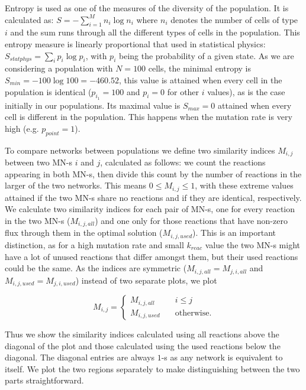 \documentclass[a4paper,12pt]{article}
\begin{document}
Entropy is used as one of the measures of the diversity of the population. It is calculated as: $S=- \sum^{M}_{i=1} n_i \log n_i $ where $n_i$ denotes the number of cells of type $i$ and the sum runs through all the different types of cells in the population. This entropy measure is linearly proportional that used in statistical physics: $S_{statphys}=\sum_i p_i \log p_i$, with $p_i$ being the probability of a given state. As we are considering a population with $N=100$ cells, the minimal entropy is $S_{min}=-100\log100=-460.52$, this value is attained when every cell in the population is identical ($p_{i_1}=100$ and $p_i=0$ for other $i$ values), as is the case initially in our populations. Its maximal value is $S_{max}=0$ attained when every cell is different in the population. This happens when the mutation rate is very high (e.g. $p_{point}=1$). 


To compare networks between populations we define two similarity indices $M_{i,j}$ between two MN-s $i$ and $j$, calculated as follows: we count the reactions appearing in both MN-s, then divide this count by the number of reactions in the larger of the two networks. This means $0\leq M_{i,j} \leq 1$, with these extreme values attained if the two MN-s share no reactions and if they are identical, respectively. We calculate two similarity indices for each pair of MN-s, one for every reaction in the two MN-s ($M_{i,j,all}$) and one only for those reactions that have non-zero flux through them in the optimal solution ($M_{i,j,used}$). This is an important distinction, as for a high mutation rate and small $k_{reac}$ value the two MN-s might have a lot of unused reactions that differ amongst them, but their used reactions could be the same. As the indices are symmetric ($M_{i,j,all}=M_{j,i,all}$ and $M_{i,j,used}=M_{j,i,used}$) instead of two separate plots, we plot 

$$
M_{i,j}= \left\{
	\begin{array}{ll}
		M_{i,j,all} & \quad i \leq j \\
		M_{i,j,used} & \quad \text{otherwise.}
	\end{array}
\right.
$$

Thus we show the similarity indices calculated using all reactions above the diagonal of the plot and those calculated using the used reactions below the diagonal. The diagonal entries are always $1$-s as any network is equivalent to itself. We plot the two regions separately to make distinguishing between the two parts straightforward.
\end{document}

